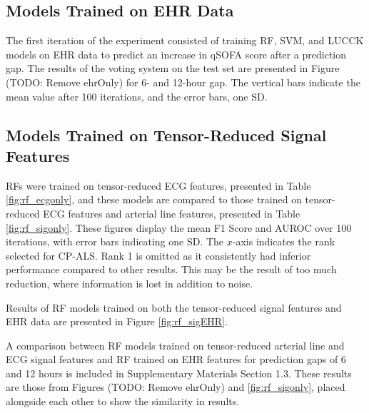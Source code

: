 \subsection{Models Trained on EHR Data}
The first iteration of the experiment consisted of training RF, SVM, and LUCCK models on EHR data to predict an increase in qSOFA score after a prediction gap. The results of the voting system on the test set are presented in Figure (TODO: Remove ehrOnly) for 6- and 12-hour gap. The vertical bars indicate the mean value after 100 iterations, and the error bars, one SD.

\subsection{Models Trained on Tensor-Reduced Signal Features}
RFs were trained on tensor-reduced ECG features, presented in Table \ref{fig:rf_ecgonly}, and these models are compared to those trained on tensor-reduced ECG features and arterial line features, presented in Table \ref{fig:rf_sigonly}. These figures display the mean F1 Score and AUROC over 100 iterations, with error bars indicating one SD. The $x$-axis indicates the rank selected for CP-ALS. Rank 1 is omitted as it consistently had inferior performance compared to other results. This may be the result of too much reduction, where information is lost in addition to noise.

Results of RF models trained on both the tensor-reduced signal features and EHR data are presented in Figure \ref{fig:rf_sigEHR}.

A comparison between RF models trained on tensor-reduced arterial line and ECG signal features and RF trained on EHR features for prediction gaps of 6 and 12 hours is included in Supplementary Materials Section 1.3. These results are those from Figures (TODO: Remove ehrOnly) and \ref{fig:rf_sigonly}, placed alongside each other to show the similarity in results.

